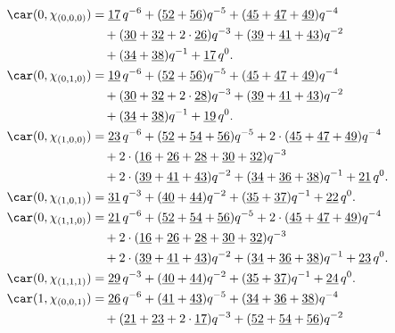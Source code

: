 \begin{align*}
	\car(0,\chi_{(0,0,0)})
	&=\underline{17}\,q^{-6}+(\underline{52}+\underline{56})q^{-5}+(\underline{45}+\underline{47}+\underline{49})q^{-4}\\
	&\quad+(\underline{30}+\underline{32}+2\cdot\underline{26})q^{-3}+(\underline{39}+\underline{41}+\underline{43})q^{-2}\\
	&\quad+(\underline{34}+\underline{38})q^{-1}+\underline{17}\,q^0.\\
	\car(0,\chi_{(0,1,0)})
	&=\underline{19}\,q^{-6}+(\underline{52}+\underline{56})q^{-5}+(\underline{45}+\underline{47}+\underline{49})q^{-4}\\
	&\quad+(\underline{30}+\underline{32}+2\cdot\underline{28})q^{-3}+(\underline{39}+\underline{41}+\underline{43})q^{-2}\\
	&\quad+(\underline{34}+\underline{38})q^{-1}+\underline{19}\,q^0.\\
	\car(0,\chi_{(1,0,0)})
	&=\underline{23}\,q^{-6}+(\underline{52}+\underline{54}+\underline{56})q^{-5}+2\cdot(\underline{45}+\underline{47}+\underline{49})q^{-4}\\
	&\quad+2\cdot(\underline{16}+\underline{26}+\underline{28}+\underline{30}+\underline{32})q^{-3}\\
	&\quad+2\cdot(\underline{39}+\underline{41}+\underline{43})q^{-2}+(\underline{34}+\underline{36}+\underline{38})q^{-1}+\underline{21}\,q^0.\\
	\car(0,\chi_{(1,0,1)})
	&=\underline{31}\,q^{-3}+(\underline{40}+\underline{44})q^{-2}+(\underline{35}+\underline{37})q^{-1}+\underline{22}\,q^0.\\
	\car(0,\chi_{(1,1,0)})
	&=\underline{21}\,q^{-6}+(\underline{52}+\underline{54}+\underline{56})q^{-5}+2\cdot(\underline{45}+\underline{47}+\underline{49})q^{-4}\\
	&\quad+2\cdot(\underline{16}+\underline{26}+\underline{28}+\underline{30}+\underline{32})q^{-3}\\
	&\quad+2\cdot(\underline{39}+\underline{41}+\underline{43})q^{-2}+(\underline{34}+\underline{36}+\underline{38})q^{-1}+\underline{23}\,q^0.\\
	\car(0,\chi_{(1,1,1)})
	&=\underline{29}\,q^{-3}+(\underline{40}+\underline{44})q^{-2}+(\underline{35}+\underline{37})q^{-1}+\underline{24}\,q^0.\\
	\car(1,\chi_{(0,0,1)})
	&=\underline{26}\,q^{-6}+(\underline{41}+\underline{43})q^{-5}+(\underline{34}+\underline{36}+\underline{38})q^{-4}\\
	&\quad+(\underline{21}+\underline{23}+2\cdot\underline{17})q^{-3}+(\underline{52}+\underline{54}+\underline{56})q^{-2}\\

\end{align*}

